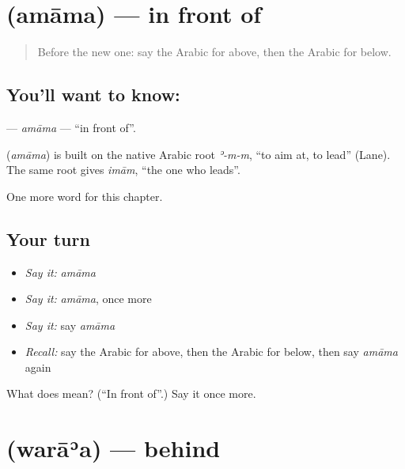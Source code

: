 \section[\texorpdfstring{\ar{أمام} (amāma)}{أمام (amāma)}]{ (amāma) — in front of}

\label{lesson:AR-C89-amama}



\begin{quote}
Before the new one: say the Arabic for above, then the Arabic for below.
\end{quote}

\subsection*{You'll want to know: }
\textbf{} — \emph{amāma} — \textquotedblleft{}in front of\textquotedblright{}.

\begin{cousinweb}
\textbf{} (\emph{amāma}) is built on the native Arabic root \emph{ʾ-m-m}, \textquotedblleft{}to aim at, to lead\textquotedblright{} (Lane). The same root gives \emph{imām}, \textquotedblleft{}the one who leads\textquotedblright{}.
\end{cousinweb}

\begin{grammarlens}[title={What you've built}]
One more word for this chapter.
\end{grammarlens}

\subsection*{Your turn}
\begin{itemize}
\raggedright
  \item \emph{Say it:} \emph{amāma}
  \item \emph{Say it:} \emph{amāma}, once more
  \item \emph{Say it:} say \emph{amāma}
  \item \emph{Recall:} say the Arabic for above, then the Arabic for below, then say \emph{amāma} again
\end{itemize}

\begin{tcolorbox}[breakable,colback=teal!4,colframe=teal!35!black,title={Before you move on}]
What does  mean? (\textquotedblleft{}In front of\textquotedblright{}.) Say it once more.
\end{tcolorbox}
\section[\texorpdfstring{\ar{وراء} (warāʾa)}{وراء (warāʾa)}]{ (warāʾa) — behind}

